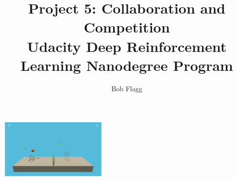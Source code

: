 \documentclass[sigchi]{acmart}
\begin{document}
%
\title{    
	Project 5: Collaboration and Competition\\
	{\large Udacity Deep Reinforcement Learning Nanodegree Program}
}

%
\author{Bob Flagg}\affiliation{}

%
\renewcommand{\shortauthors}{Bob Flagg}

%

%
%

%
\begin{teaserfigure}
	\centering
  \includegraphics[width=0.4\textwidth]{teaser}
  \caption{}
  \label{fig:teaser}
\end{teaserfigure}

%
\maketitle

\end{document}
